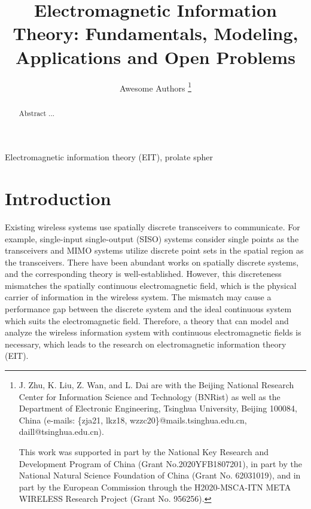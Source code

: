 \documentclass[journal,twocolumn]{IEEEtran}
\begin{document}
\title{Electromagnetic Information Theory: Fundamentals, Modeling, Applications and Open Problems}

\author{{Awesome Authors}
\thanks{J. Zhu, K. Liu, Z. Wan, and L. Dai are with the Beijing National Research Center for Information Science and Technology (BNRist) as well as the Department of Electronic Engineering, Tsinghua University, Beijing 100084, China (e-mails: \{zja21, lkz18, wzzc20\}@mails.tsinghua.edu.cn, daill@tsinghua.edu.cn).


This work was supported in part by the National Key Research and Development Program of China (Grant No.2020YFB1807201), in part by the National Natural Science Foundation of China (Grant No. 62031019), and in part by the European Commission through the H2020-MSCA-ITN META WIRELESS Research Project (Grant No. 956256).}
}

\maketitle

\begin{abstract}
    Abstract ...
\end{abstract}

\begin{IEEEkeywords}
    Electromagnetic information theory (EIT), prolate spher
\end{IEEEkeywords}

\section{Introduction}
Existing wireless systems use spatially discrete transceivers to communicate. For example, single-input single-output (SISO) systems consider single points as the transceivers and MIMO systems utilize discrete point sets in the spatial region as the transceivers. 
There have been abundant works on spatially discrete systems, and the corresponding theory is well-established. 
However, this discreteness mismatches the spatially continuous electromagnetic field, which is the physical carrier of information in the wireless system. 
The mismatch may cause a performance gap between the discrete system and the ideal continuous system which suits the electromagnetic field. 
Therefore, a theory that can model and analyze the wireless information system with continuous electromagnetic fields is necessary, which leads to the research on electromagnetic information theory (EIT).
\end{document}
